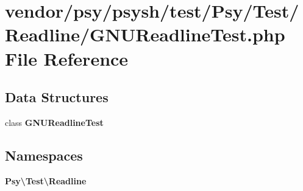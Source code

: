\section{vendor/psy/psysh/test/\+Psy/\+Test/\+Readline/\+G\+N\+U\+Readline\+Test.php File Reference}
\label{_g_n_u_readline_test_8php}
\subsection*{Data Structures}
\begin{DoxyCompactItemize}
\item 
class {\bf G\+N\+U\+Readline\+Test}
\end{DoxyCompactItemize}
\subsection*{Namespaces}
\begin{DoxyCompactItemize}
\item 
 {\bf Psy\textbackslash{}\+Test\textbackslash{}\+Readline}
\end{DoxyCompactItemize}
